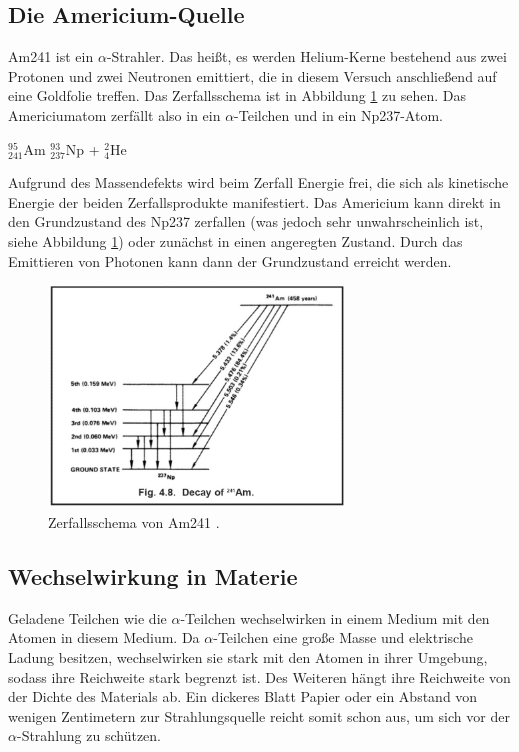 \subsection{Die Americium-Quelle}

Am241 ist ein $\alpha$-Strahler. Das heißt, es werden Helium-Kerne bestehend aus zwei Protonen und zwei Neutronen emittiert,
die in diesem Versuch anschließend auf eine Goldfolie treffen. Das Zerfallsschema ist in Abbildung \ref{fig:zerfall} zu sehen.
Das Americiumatom zerfällt also in ein $\alpha$-Teilchen und in ein Np237-Atom.

\begin{center}
  $^{95}_{241}$Am \rightarrow $^{93}_{237}$Np + $^{2}_{4}$He
\end{center}

Aufgrund des Massendefekts wird beim Zerfall Energie frei, die sich als kinetische Energie der beiden Zerfallsprodukte
manifestiert. Das Americium kann direkt in den Grundzustand des Np237 zerfallen (was jedoch sehr unwahrscheinlich ist, siehe Abbildung
\ref{fig:zerfall}) oder zunächst in einen angeregten Zustand. Durch das Emittieren von Photonen kann dann der Grundzustand
erreicht werden.

\begin{figure}
\centering
\includegraphics[width=0.7\textwidth]{content/zerfall.png}
\caption{Zerfallsschema von Am241 \cite{gsi}.}
\label{fig:zerfall}
\end{figure}

\subsection{Wechselwirkung in Materie}

Geladene Teilchen wie die $\alpha$-Teilchen wechselwirken in einem Medium mit den Atomen in diesem Medium. Da $\alpha$-Teilchen
eine große Masse und elektrische Ladung besitzen, wechselwirken sie stark mit den Atomen in ihrer Umgebung, sodass ihre
Reichweite stark begrenzt ist. Des Weiteren hängt ihre Reichweite von der Dichte des Materials ab.
Ein dickeres Blatt Papier oder ein Abstand von wenigen Zentimetern zur Strahlungsquelle reicht somit schon aus, um sich vor der
$\alpha$-Strahlung zu schützen.

